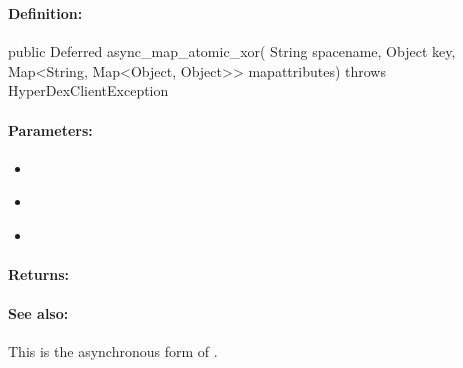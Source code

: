 \pagebreak
\subsubsection{}
\label{api:java:async_map_atomic_xor}


\paragraph{Definition:}
\begin{javacode}
public Deferred async_map_atomic_xor(
        String spacename,
        Object key,
        Map<String, Map<Object, Object>> mapattributes) throws HyperDexClientException
\end{javacode}

\paragraph{Parameters:}
\begin{itemize}[noitemsep]
\item {}\\

\item {}\\

\item {}\\

\end{itemize}

\paragraph{Returns:}


\paragraph{See also:}  This is the asynchronous form of .

\pagebreak
\subsubsection{}
\label{api:java:cond_map_atomic_xor}


